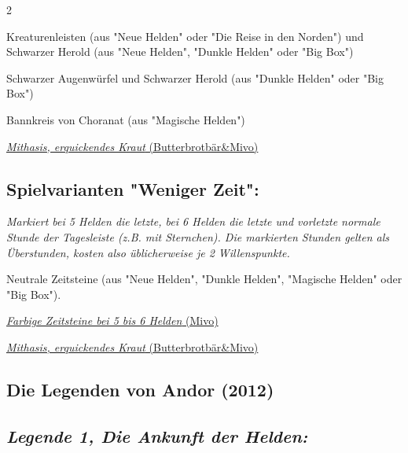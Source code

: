 \documentclass[10pt, a4paper, oneside]{book}
\newcommand{\fan}[1]{\textit{#1}}
\begin{document}
\begin{multicols*}{2}
\begin{nobgcolor}
\bullet{} Kreaturenleisten (aus "Neue Helden"\supercite{NH:Begleitheft} oder "Die Reise in den Norden"\supercite{DRidN:Begleitheft}) und Schwarzer Herold (aus "Neue Helden"\supercite{NH:Begleitheft}, "Dunkle Helden"\supercite{DH:Begleitheft} oder "Big Box"\supercite{BiBo:Bonus-Heft})

\bullet{} Schwarzer Augenwürfel und Schwarzer Herold (aus "Dunkle Helden"\supercite{DH:Begleitheft} oder "Big Box"\supercite{BiBo:Bonus-Heft})

\bullet{} Bannkreis von Choranat (aus "Magische Helden")
\supercite{MH:Begleitheft}

\href{https://legenden-von-andor.de/forum/viewtopic.php?p=132952#p132952}
{\blacktriangleright \fan{Mithasis, erquickendes Kraut} (Butterbrotbär\&Mivo)}




\subsection{Spielvarianten "Weniger Zeit":}

\bullet{} \fan{Markiert bei 5 Helden die letzte, bei 6 Helden die letzte und vorletzte normale Stunde der Tagesleiste (z.B. mit Sternchen). Die markierten Stunden gelten als Überstunden, kosten also üblicherweise je 2 Willenspunkte.}

\bullet{} Neutrale Zeitsteine (aus "Neue Helden"\supercite{NH:Begleitheft}, "Dunkle Helden"\supercite{DH:Begleitheft}, "Magische Helden"\supercite{MH:Begleitheft} oder "Big Box"\supercite{BiBo:Bonus-Heft}).

\href{https://legenden-von-andor.de/forum/viewtopic.php?p=130491#p130491}
{\blacktriangleright \fan{Farbige Zeitsteine bei 5 bis 6 Helden} (Mivo)}

\href{https://legenden-von-andor.de/forum/viewtopic.php?p=132952#p132952}
{\blacktriangleright \fan{Mithasis, erquickendes Kraut} (Butterbrotbär\&Mivo)}


\end{nobgcolor}







\begin{bgcolor}
\section{Die Legenden von Andor (2012)}


\subsection{\fan{Legende 1, Die Ankunft der Helden:}}



\end{bgcolor}
\end{multicols*}
\end{document}
